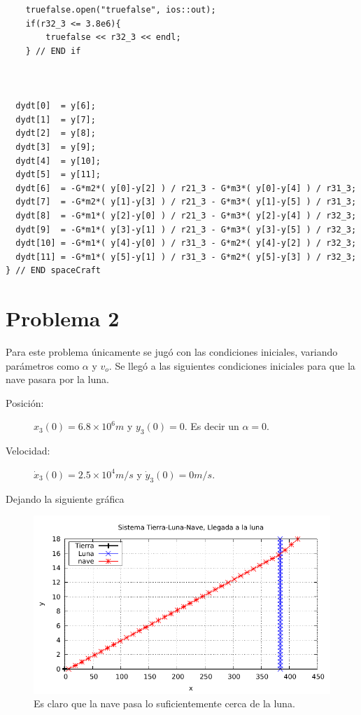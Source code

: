\begin{lstlisting}
	truefalse.open("truefalse", ios::out);
	if(r32_3 <= 3.8e6){
		truefalse << r32_3 << endl;
	} // END if



  dydt[0]  = y[6];
  dydt[1]  = y[7];
  dydt[2]  = y[8];
  dydt[3]  = y[9];
  dydt[4]  = y[10];
  dydt[5]  = y[11];
  dydt[6]  = -G*m2*( y[0]-y[2] ) / r21_3 - G*m3*( y[0]-y[4] ) / r31_3;
  dydt[7]  = -G*m2*( y[1]-y[3] ) / r21_3 - G*m3*( y[1]-y[5] ) / r31_3;
  dydt[8]  = -G*m1*( y[2]-y[0] ) / r21_3 - G*m3*( y[2]-y[4] ) / r32_3;
  dydt[9]  = -G*m1*( y[3]-y[1] ) / r21_3 - G*m3*( y[3]-y[5] ) / r32_3;
  dydt[10] = -G*m1*( y[4]-y[0] ) / r31_3 - G*m2*( y[4]-y[2] ) / r32_3;
  dydt[11] = -G*m1*( y[5]-y[1] ) / r31_3 - G*m2*( y[5]-y[3] ) / r32_3;
} // END spaceCraft

\end{lstlisting}




\section*{Problema 2}
Para este problema únicamente se jugó con las condiciones iniciales, variando parámetros como $\alpha$ y $v_o$. Se llegó a las siguientes condiciones iniciales para que la nave pasara por la luna.

\begin{description}
	\item[Posición: ] $x_3 (0) = 6.8\times 10^6 m$ y $y_3 (0) = 0.$ Es decir un $\alpha = 0$.
	\item[Velocidad: ] $\dot{x} _3 (0) = 2.5\times 10^4 m/s$ y $\dot{y} _3 (0) = 0m/s$. 
\end{description}
Dejando la siguiente gráfica
\begin{figure}[H]
	\centering
	\includegraphics[scale=0.8]{../img/ej5-17.pdf}
	\caption{Es claro que la nave pasa lo suficientemente cerca de la luna.}
	\label{ej5-17}
\end{figure}











